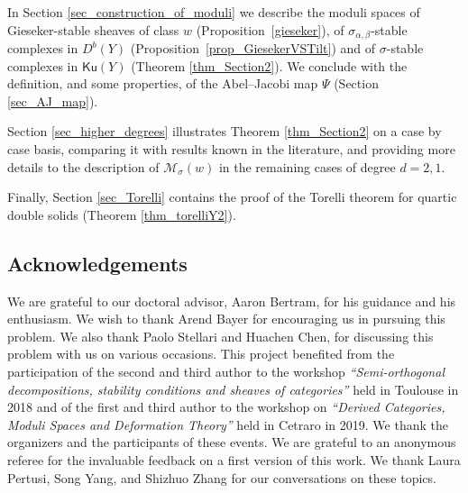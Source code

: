 \documentclass[11pt]{amsart}
\theoremstyle{definition}
\newcommand{\sM}{\mathcal{M}}
\newcommand{\AAA}[1]{\textcolor{red}{#1}}
\newcommand{\Ku}{\mathsf{Ku}}
\begin{document}
In Section \ref{sec_construction_of_moduli} we describe the moduli spaces of Gieseker-stable sheaves of class $w$ (Proposition~\ref{gieseker}), of $\sigma_{\alpha,\beta}$-stable complexes in $D^b(Y)$ (Proposition~\ref{prop_GiesekerVSTilt}) and of $\sigma$-stable complexes in $\Ku(Y)$ (Theorem \ref{thm_Section2}). We conclude with the definition, and some properties, of the Abel--Jacobi map $\Psi$ (Section \ref{sec_AJ_map}).

Section \ref{sec_higher_degrees} illustrates Theorem \ref{thm_Section2} on a case by case basis, comparing it with results known in the literature, and providing more details to the description of $\sM_\sigma(w)$ in the remaining cases of degree $d=2,1$.

Finally, Section \ref{sec_Torelli} contains the proof of the Torelli theorem for quartic double solids (Theorem \ref{thm_torelliY2}).


%



\subsection*{Acknowledgements} We are grateful to our doctoral advisor, Aaron Bertram, for his guidance and his enthusiasm. We wish to thank Arend Bayer for encouraging us in pursuing this problem. We also thank Paolo Stellari and Huachen Chen, for discussing this problem with us on various occasions. This project benefited from the participation of the second and third author to the workshop \emph{``Semi-orthogonal decompositions, stability conditions and sheaves of categories''} held in Toulouse in 2018 and of the first and third author to the workshop on \emph{``Derived Categories, Moduli Spaces and Deformation Theory''} held in Cetraro in 2019. We thank the organizers and the participants of these events. We are grateful to an anonymous referee for the invaluable feedback on a first version of this work. We thank Laura Pertusi, Song Yang, and Shizhuo Zhang for our conversations on these topics.
\end{document}
